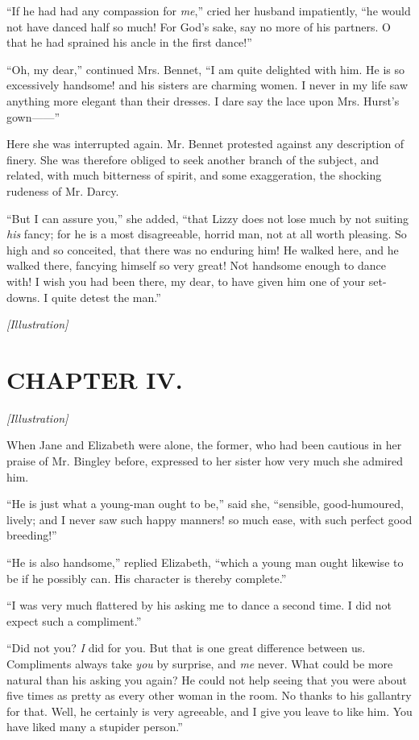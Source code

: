 \documentclass[12pt]{book}
\begin{document}
``If he had had any compassion for \textit{me},'' cried her husband impatiently, ``he would not have danced half so much! For God's sake, say no more of his partners. O that he had sprained his ancle in the first dance!''

``Oh, my dear,'' continued Mrs. Bennet, ``I am quite delighted with him. He is so excessively handsome! and his sisters are charming women. I never in my life saw anything more elegant than their dresses. I dare say the lace upon Mrs. Hurst's gown------''

Here she was interrupted again. Mr. Bennet protested against any description of finery. She was therefore obliged to seek another branch of the subject, and related, with much bitterness of spirit, and some exaggeration, the shocking rudeness of Mr. Darcy.

``But I can assure you,'' she added, ``that Lizzy does not lose much by not suiting \textit{his} fancy; for he is a most disagreeable, horrid man, not at all worth pleasing. So high and so conceited, that there was no enduring him! He walked here, and he walked there, fancying himself so very great! Not handsome enough to dance with! I wish you had been there, my dear, to have given him one of your set-downs. I quite detest the man.''

\emph{[Illustration]}

\chapter{CHAPTER IV.}

\emph{[Illustration]}

When Jane and Elizabeth were alone, the former, who had been cautious in her praise of Mr. Bingley before, expressed to her sister how very much she admired him.

``He is just what a young-man ought to be,'' said she, ``sensible, good-humoured, lively; and I never saw such happy manners! so much ease, with such perfect good breeding!''

``He is also handsome,'' replied Elizabeth, ``which a young man ought likewise to be if he possibly can. His character is thereby complete.''

``I was very much flattered by his asking me to dance a second time. I did not expect such a compliment.''

``Did not you? \textit{I} did for you. But that is one great difference between us. Compliments always take \textit{you} by surprise, and \textit{me} never. What could be more natural than his asking you again? He could not help seeing that you were about five times as pretty as every other woman in the room. No thanks to his gallantry for that. Well, he certainly is very agreeable, and I give you leave to like him. You have liked many a stupider person.''
\end{document}

